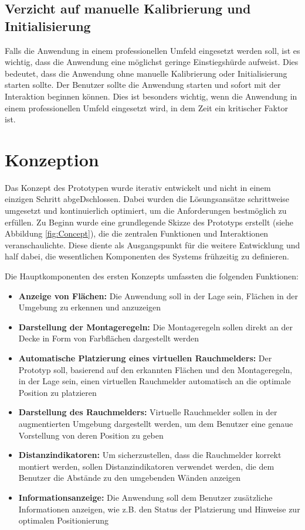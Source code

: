 \subsection{Verzicht auf manuelle Kalibrierung und Initialisierung}

Falls die Anwendung in einem professionellen Umfeld eingesetzt werden soll, ist es wichtig, dass die Anwendung eine möglichst geringe Einstiegshürde aufweist. Dies bedeutet, dass die Anwendung ohne manuelle Kalibrierung oder Initialisierung starten sollte. Der Benutzer sollte die Anwendung starten und sofort mit der Interaktion beginnen können. Dies ist besonders wichtig, wenn die Anwendung in einem professionellen Umfeld eingesetzt wird, in dem Zeit ein kritischer Faktor ist.

\section{Konzeption}

Das Konzept des Prototypen wurde iterativ entwickelt und nicht in einem einzigen Schritt abgeDschlossen. Dabei wurden die Lösungsansätze schrittweise umgesetzt und kontinuierlich optimiert, um die Anforderungen bestmöglich zu erfüllen. Zu Beginn wurde eine grundlegende Skizze des Prototyps erstellt (siehe Abbildung \ref{fig:Concept}), die die zentralen Funktionen und Interaktionen veranschaulichte. Diese diente als Ausgangspunkt für die weitere Entwicklung und half dabei, die wesentlichen Komponenten des Systems frühzeitig zu definieren.

Die Hauptkomponenten des ersten Konzepts umfassten die folgenden Funktionen:

\begin{itemize}
    \item \textbf{Anzeige von Flächen:} Die Anwendung soll in der Lage sein, Flächen in der Umgebung zu erkennen und anzuzeigen
    \item \textbf{Darstellung der Montageregeln:} Die Montageregeln sollen direkt an der Decke in Form von Farbflächen dargestellt werden
    \item \textbf{Automatische Platzierung eines virtuellen Rauchmelders:} Der Prototyp soll, basierend auf den erkannten Flächen und den Montageregeln, in der Lage sein, einen virtuellen Rauchmelder automatisch an die optimale Position zu platzieren
    \item \textbf{Darstellung des Rauchmelders:} Virtuelle Rauchmelder sollen in der augmentierten Umgebung dargestellt werden, um dem Benutzer eine genaue Vorstellung von deren Position zu geben
    \item \textbf{Distanzindikatoren:} Um sicherzustellen, dass die Rauchmelder korrekt montiert werden, sollen Distanzindikatoren verwendet werden, die dem Benutzer die Abstände zu den umgebenden Wänden anzeigen
    \item \textbf{Informationsanzeige:} Die Anwendung soll dem Benutzer zusätzliche Informationen anzeigen, wie z.B. den Status der Platzierung und Hinweise zur optimalen Positionierung
\end{itemize}

